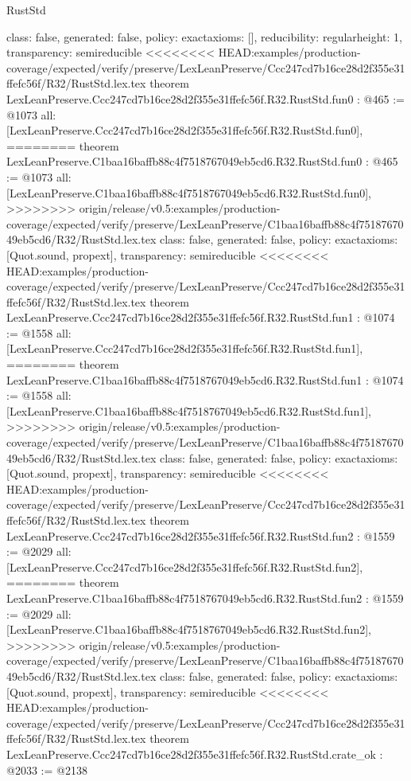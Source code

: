 \begin{lexlean}{RustStd}
\begin{coremodule}
{\begin{coremodule}
{{{  class: false,
  generated: false,
  policy: exact{axioms: []},
  reducibility: regular{height: 1},
  transparency: semireducible
}
<<<<<<<< HEAD:examples/production-coverage/expected/verify/preserve/LexLeanPreserve/Ccc247cd7b16ce28d2f355e31ffefc56f/R32/RustStd.lex.tex
theorem LexLeanPreserve.Ccc247cd7b16ce28d2f355e31ffefc56f.R32.RustStd.fun0 : @465 := @1073 {
  all: [LexLeanPreserve.Ccc247cd7b16ce28d2f355e31ffefc56f.R32.RustStd.fun0],
========
theorem LexLeanPreserve.C1baa16baffb88c4f7518767049eb5cd6.R32.RustStd.fun0 : @465 := @1073 {
  all: [LexLeanPreserve.C1baa16baffb88c4f7518767049eb5cd6.R32.RustStd.fun0],
>>>>>>>> origin/release/v0.5:examples/production-coverage/expected/verify/preserve/LexLeanPreserve/C1baa16baffb88c4f7518767049eb5cd6/R32/RustStd.lex.tex
  class: false,
  generated: false,
  policy: exact{axioms: [Quot.sound, propext]},
  transparency: semireducible
}
<<<<<<<< HEAD:examples/production-coverage/expected/verify/preserve/LexLeanPreserve/Ccc247cd7b16ce28d2f355e31ffefc56f/R32/RustStd.lex.tex
theorem LexLeanPreserve.Ccc247cd7b16ce28d2f355e31ffefc56f.R32.RustStd.fun1 : @1074 := @1558 {
  all: [LexLeanPreserve.Ccc247cd7b16ce28d2f355e31ffefc56f.R32.RustStd.fun1],
========
theorem LexLeanPreserve.C1baa16baffb88c4f7518767049eb5cd6.R32.RustStd.fun1 : @1074 := @1558 {
  all: [LexLeanPreserve.C1baa16baffb88c4f7518767049eb5cd6.R32.RustStd.fun1],
>>>>>>>> origin/release/v0.5:examples/production-coverage/expected/verify/preserve/LexLeanPreserve/C1baa16baffb88c4f7518767049eb5cd6/R32/RustStd.lex.tex
  class: false,
  generated: false,
  policy: exact{axioms: [Quot.sound, propext]},
  transparency: semireducible
}
<<<<<<<< HEAD:examples/production-coverage/expected/verify/preserve/LexLeanPreserve/Ccc247cd7b16ce28d2f355e31ffefc56f/R32/RustStd.lex.tex
theorem LexLeanPreserve.Ccc247cd7b16ce28d2f355e31ffefc56f.R32.RustStd.fun2 : @1559 := @2029 {
  all: [LexLeanPreserve.Ccc247cd7b16ce28d2f355e31ffefc56f.R32.RustStd.fun2],
========
theorem LexLeanPreserve.C1baa16baffb88c4f7518767049eb5cd6.R32.RustStd.fun2 : @1559 := @2029 {
  all: [LexLeanPreserve.C1baa16baffb88c4f7518767049eb5cd6.R32.RustStd.fun2],
>>>>>>>> origin/release/v0.5:examples/production-coverage/expected/verify/preserve/LexLeanPreserve/C1baa16baffb88c4f7518767049eb5cd6/R32/RustStd.lex.tex
  class: false,
  generated: false,
  policy: exact{axioms: [Quot.sound, propext]},
  transparency: semireducible
}
<<<<<<<< HEAD:examples/production-coverage/expected/verify/preserve/LexLeanPreserve/Ccc247cd7b16ce28d2f355e31ffefc56f/R32/RustStd.lex.tex
theorem LexLeanPreserve.Ccc247cd7b16ce28d2f355e31ffefc56f.R32.RustStd.crate_ok : @2033 := @2138 {
}}}}}}
\end{coremodule}}
\end{coremodule}
\end{lexlean}
